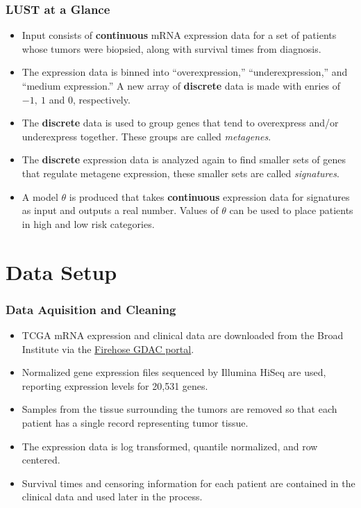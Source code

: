 \documentclass[
	11pt, %
]{beamer}
\begin{document}
\begin{frame}
	\frametitle{LUST at a Glance}
	
	\begin{itemize}
        \item Input consists of \textbf{continuous} mRNA expression data for a set of patients whose tumors were biopsied, along with survival times from diagnosis.
        \pause
        \item The expression data is binned into ``overexpression,'' ``underexpression,'' and ``medium expression.'' A new array of \textbf{discrete} data is made with enries of $-1,\ 1$ and $0$, respectively.
        \pause
        \item The \textbf{discrete} data is used to group genes that tend to overexpress and/or underexpress together. These groups are called \emph{metagenes}. 
        \pause
        \item The \textbf{discrete} expression data is analyzed again to find smaller sets of genes that regulate metagene expression, these smaller sets are called \emph{signatures}.
        \pause
        \item A model $\theta$ is produced that takes \textbf{continuous} expression data for signatures as input and outputs a real number. Values of $\theta$ can be used to place patients in high and low risk categories. 
    \end{itemize}
\end{frame}


\section{Data Setup}

\begin{frame}
	\frametitle{Data Aquisition and Cleaning}
	
	\begin{itemize}
        \item TCGA mRNA expression and clinical data are downloaded from the Broad Institute via the \href{https://gdac.broadinstitute.org/}{Firehose GDAC portal}.
        \pause
        \item Normalized gene expression files sequenced by Illumina HiSeq are used, reporting expression levels for 20,531 genes.
        \pause
        \item Samples from the tissue surrounding the tumors are removed so that each patient has a single record representing tumor tissue.
        \pause
        \item The expression data is log transformed, quantile normalized, and row centered.
        \pause
        \item Survival times and censoring information for each patient are contained in the clinical data and used later in the process.
    \end{itemize}
\end{frame}
\end{document}
